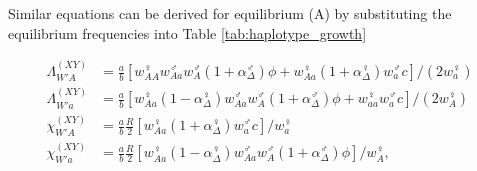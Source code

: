 \documentclass[10pt,letterpaper]{article}
\begin{document}


Similar equations can be derived for equilibrium (A) by substituting the equilibrium frequencies into Table \ref{tab:haplotype_growth}

\begin{subequations}\label{Ainvasion}
\begin{align}
\Lambda_{W'A}^{(XY)}&= \frac{a}{b} \left[w_{AA}^\female w_{Aa}^\male w_A^\male (1+\alpha^\male_\Delta) \phi +  w_{Aa}^\female (1+\alpha^\female_\Delta) w_a^\male c \right] / (2 w_a^\female) \\
\Lambda_{W'a}^{(XY)}&= \frac{a}{b} \left[ w_{Aa}^\female (1-\alpha^\female_\Delta) w_{Aa}^\male w_A^\male (1+\alpha^\male_\Delta) \phi +  w_{aa}^\female w_a^\male c \right] / (2 w_A^\female) \\
\chi_{W'A}^{(XY)}&= \frac{a}{b} \frac{R}{2} \left[   w_{Aa}^\female (1+\alpha^\female_\Delta) w_a^\male c \right] / w_a^\female\\ 
\chi_{W'a}^{(XY)}&= \frac{a}{b} \frac{R}{2} \left[ w_{Aa}^\female (1-\alpha^\female_\Delta) w_{Aa}^\male w_A^\male (1+\alpha^\male_\Delta) \phi \right] / w_A^\female,
\end{align}
\end{subequations}
\end{document}
